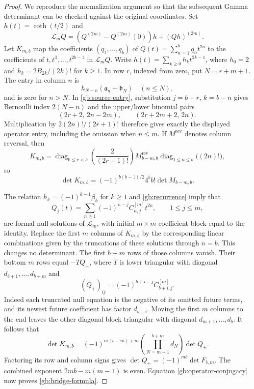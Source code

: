 \documentclass[11pt,a4paper]{article}
\numberwithin{equation}{section}
\theoremstyle{definition}
\theoremstyle{remark}
\begin{document}
\begin{proof}
We reproduce the normalization argument so that the subsequent
Gamma determinant can be checked against the original coordinates.
Set $h(t)=\coth(t/2)$ and
\[
 \mathcal L_mQ=(Q^{(2m)}-Q^{(2m)}(0))h+(Qh)^{(2m)}.
\]
Let $K_{m,b}$ map the coefficients $(q_1,\ldots,q_b)$ of
$Q(t)=\sum_{n=1}^bq_nt^{2n}$ to the coefficients of
$t,t^3,\ldots,t^{2b-1}$ in $\mathcal L_mQ$.
Write $h(t)=\sum_{k\ge0}h_kt^{2k-1}$, where $h_0=2$ and
$h_k=2B_{2k}/(2k)!$ for $k\ge1$.  In row $r$, indexed from zero,
put $N=r+m+1$.  The entry in column $n$ is
\[
 h_{N-n}(\mathfrak a_n+\mathfrak b_N)\quad(n\le N),
\]
and is zero for $n>N$.  In \eqref{gb:source-entry}, substitution
$j=b+r$, $k=b-n$ gives Bernoulli index $2(N-n)$ and the upper/lower
binomial pairs
\[
 (2r+2,\,2n-2m),\qquad(2r+2m+2,\,2n).
\]
Multiplication by $2(2n)!/(2r+1)!$ therefore gives exactly the
displayed operator entry, including the omission when $n\le m$.
If $M^{\mathrm{rev}}$ denotes column reversal, then
\[
 K_{m,b}=
 \operatorname{diag}_{0\le r<b}\!\left(\frac2{(2r+1)!}\right)
 M_{b-m,b}^{\mathrm{rev}}
 \operatorname{diag}_{1\le n\le b}\!\bigl((2n)!\bigr),
\]
so
\begin{equation}\label{gb:operator-conjugacy}
 \det K_{m,b}=(-1)^{b(b-1)/2}4^bb!\det M_{b-m,b}.
\end{equation}

The relation $h_k=(-1)^{k-1}\beta_k$ for $k\ge1$ and
\eqref{gb:recurrence} imply that
\[
 Q_j(t)=\sum_{n\ge1}(-1)^{n-j}C^{[m]}_{n,j}t^{2n},
 \qquad1\le j\le m,
\]
are formal null solutions of $\mathcal L_m$, with initial
$m\times m$ coefficient block equal to the identity.  Replace
the first $m$ columns of $K_{m,b}$ by the corresponding linear
combinations given by the truncations of these solutions through
$n=b$.  This changes no determinant.  The first $b-m$ rows of
those columns vanish.  Their bottom $m$ rows equal $-TQ_+$, where
$T$ is lower triangular with diagonal $d_{b+1},\ldots,d_{b+m}$ and
\[
 (Q_+)_{ij}=(-1)^{b+i-j}C^{[m]}_{b+i,j}.
\]
Indeed each truncated null equation is the negative of its omitted
future terms, and its newest future coefficient has factor $d_{b+i}$.
Moving the first $m$ columns to the end leaves the other diagonal
block triangular with diagonal $d_{m+1},\ldots,d_b$.  It follows that
\[
 \det K_{m,b}=(-1)^{m(b-m)+m}
       \left(\prod_{N=m+1}^{b+m}d_N\right)\det Q_+.
\]
Factoring its row and column signs gives
$\det Q_+=(-1)^{mb}\det F_{b,m}$.  The combined exponent
$2mb-m(m-1)$ is even.  Equation \eqref{gb:operator-conjugacy}
now proves \eqref{gb:bridge-formula}.
\end{proof}
\end{document}
